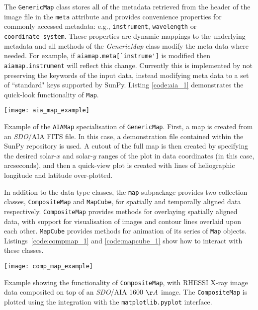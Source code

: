 The \texttt{GenericMap} class stores all of the metadata retrieved from the header of
the image file in the \texttt{meta} attribute and provides convenience 
properties for commonly accessed metadata: e.g., \texttt{instrument}, 
\texttt{wavelength} or \texttt{coordinate\_system}.
These properties are dynamic mappings to the underlying metadata and all methods 
of the \textit{GenericMap} class modify the meta data where needed.
For example, if \verb|aiamap.meta[`instrume']| is modified then \verb|aiamap.instrument| 
will reflect this change.
Currently this is implemented by not preserving the keywords of the input data,
instead modifying meta data to a set of ``standard" keys supported by SunPy.
Listing \ref{code:aia_1} demonstrates the quick-look functionality of 
\texttt{Map}.

\begin{listing}[H]
\begin{center}
\texttt{[image: aia\_map\_example]}
\end{center}
\caption{Example of the \texttt{AIAMap} specialisation of 
\texttt{GenericMap}. First, a map is created from an \textit{SDO}/AIA FITS file. In this case, a demonstration file contained within the SunPy repository is used. A cutout
of the full map is then created by specifying the desired solar-$x$ and solar-$y$ ranges of the plot in data coordinates (in this case, arcseconds), and then a quick-view plot is created with lines of heliographic longitude and latitude over-plotted.}
\label{code:aia_1}
\end{listing}

In addition to the data-type classes, the \texttt{map} subpackage provides two 
collection classes, \texttt{CompositeMap} and \texttt{MapCube}, for 
spatially and temporally aligned data respectively.
\texttt{CompositeMap} provides methods for overlaying spatially aligned 
data, with support for visualisation of images and contour lines overlaid 
upon each other.
\texttt{MapCube} provides methods for animation of its series of \texttt{Map} 
objects. Listings~\ref{code:compmap_1} and \ref{code:mapcube_1} show how to 
interact with these classes.

\begin{listing}[H]
\begin{center}
\texttt{[image: comp\_map\_example]}
\end{center}
\caption{Example showing the functionality of \texttt{CompositeMap}, with RHESSI X-ray image data composited
on top of an \textit{SDO}/AIA 1600 $\AA$ image. The \texttt{CompositeMap} is plotted using the integration with the \texttt{matplotlib.pyplot} interface.}
\label{code:compmap_1}
\end{listing}

